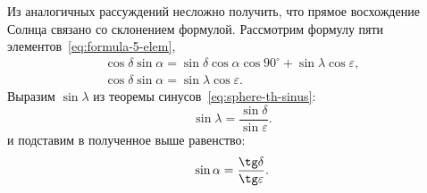 Из аналогичных рассуждений несложно получить, что прямое восхождение Солнца связано со склонением формулой. Рассмотрим формулу пяти элементов~\eqref{eq:formula-5-elem},
\begin{gather*}
    \cos \delta \sin \alpha = \sin \delta \cos \alpha \cos 90^\circ + \sin \lambda \cos \varepsilon,\\
    \cos \delta \sin \alpha = \sin \lambda \cos \varepsilon.
\end{gather*}
Выразим $\sin \lambda$ из теоремы синусов~\eqref{eq:sphere-th-sinus}:
\begin{equation*}    
    \sin \lambda = \frac{\sin \delta}{\sin \varepsilon}.
\end{equation*}
и подставим в полученное выше равенство:
\begin{equation}
    \sin\alpha = \frac{\tg\delta}{\tg\varepsilon}.  
    \label{eq:sin-alpha}
\end{equation}




